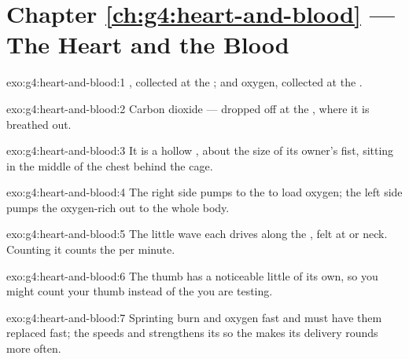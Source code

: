 \section*{Chapter \ref{ch:g4:heart-and-blood} --- The Heart and the Blood}

\begin{solution}{exo:g4:heart-and-blood:1}
, collected at the ; and oxygen,
collected at the .
\end{solution}

\begin{solution}{exo:g4:heart-and-blood:2}
Carbon dioxide --- dropped off at the , where it is
breathed out.
\end{solution}

\begin{solution}{exo:g4:heart-and-blood:3}
It is a hollow , about the size of its owner's fist,
sitting in the middle of the chest behind the  cage.
\end{solution}

\begin{solution}{exo:g4:heart-and-blood:4}
The right side pumps  to the  to load oxygen; the
left side pumps the oxygen-rich  out to the whole body.
\end{solution}

\begin{solution}{exo:g4:heart-and-blood:5}
The little wave each  drives along the , felt
at  or neck. Counting it counts the  per
minute.
\end{solution}

\begin{solution}{exo:g4:heart-and-blood:6}
The thumb has a noticeable little  of its own, so you
might count your thumb instead of the  you are testing.
\end{solution}

\begin{solution}{exo:g4:heart-and-blood:7}
Sprinting  burn  and oxygen fast and must have
them replaced fast; the  speeds and strengthens its 
so the  makes its delivery rounds more often.
\end{solution}

